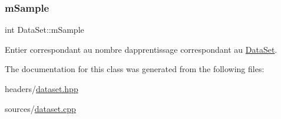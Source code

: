 \subsubsection{\texorpdfstring{m\+Sample}{mSample}}
{\footnotesize\ttfamily int Data\+Set\+::m\+Sample\hspace{0.3cm}{\ttfamily [private]}}



Entier correspondant au nombre d\textquotesingle{}apprentissage correspondant au \hyperlink{classDataSet}{Data\+Set}. 



The documentation for this class was generated from the following files\+:\begin{DoxyCompactItemize}
\item 
headers/\hyperlink{dataset_8hpp}{dataset.\+hpp}\item 
sources/\hyperlink{dataset_8cpp}{dataset.\+cpp}\end{DoxyCompactItemize}
